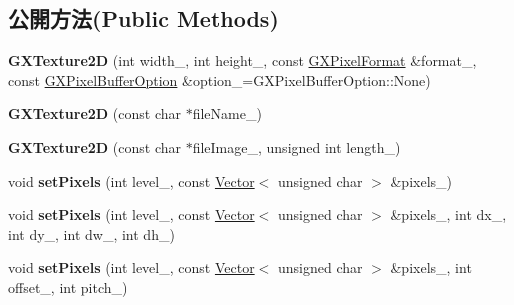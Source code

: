 \subsection*{公開方法(Public Methods)}
\begin{DoxyCompactItemize}
\item 
{\bfseries G\+X\+Texture2D} (int width\+\_\+, int height\+\_\+, const \hyperlink{class_i_dream_sky_1_1_g_x_pixel_format}{G\+X\+Pixel\+Format} \&format\+\_\+, const \hyperlink{class_i_dream_sky_1_1_g_x_pixel_buffer_option}{G\+X\+Pixel\+Buffer\+Option} \&option\+\_\+=G\+X\+Pixel\+Buffer\+Option\+::\+None)\hypertarget{class_i_dream_sky_1_1_g_x_texture2_d_af2883838dfbb887234486878f519c29e}{}\label{class_i_dream_sky_1_1_g_x_texture2_d_af2883838dfbb887234486878f519c29e}

\item 
{\bfseries G\+X\+Texture2D} (const char $\ast$file\+Name\+\_\+)\hypertarget{class_i_dream_sky_1_1_g_x_texture2_d_a9025f664d2fa0cc7e0f4b911809fde10}{}\label{class_i_dream_sky_1_1_g_x_texture2_d_a9025f664d2fa0cc7e0f4b911809fde10}

\item 
{\bfseries G\+X\+Texture2D} (const char $\ast$file\+Image\+\_\+, unsigned int length\+\_\+)\hypertarget{class_i_dream_sky_1_1_g_x_texture2_d_ac49b237e5e8dc37812b043bada830181}{}\label{class_i_dream_sky_1_1_g_x_texture2_d_ac49b237e5e8dc37812b043bada830181}

\item 
void {\bfseries set\+Pixels} (int level\+\_\+, const \hyperlink{class_i_dream_sky_1_1_vector}{Vector}$<$ unsigned char $>$ \&pixels\+\_\+)\hypertarget{class_i_dream_sky_1_1_g_x_texture2_d_a99b1fd15acda4d83f0834939e2f5a1ed}{}\label{class_i_dream_sky_1_1_g_x_texture2_d_a99b1fd15acda4d83f0834939e2f5a1ed}

\item 
void {\bfseries set\+Pixels} (int level\+\_\+, const \hyperlink{class_i_dream_sky_1_1_vector}{Vector}$<$ unsigned char $>$ \&pixels\+\_\+, int dx\+\_\+, int dy\+\_\+, int dw\+\_\+, int dh\+\_\+)\hypertarget{class_i_dream_sky_1_1_g_x_texture2_d_a61f6f8b275a8ef7cdbec91286ee4bcc9}{}\label{class_i_dream_sky_1_1_g_x_texture2_d_a61f6f8b275a8ef7cdbec91286ee4bcc9}

\item 
void {\bfseries set\+Pixels} (int level\+\_\+, const \hyperlink{class_i_dream_sky_1_1_vector}{Vector}$<$ unsigned char $>$ \&pixels\+\_\+, int offset\+\_\+, int pitch\+\_\+)\hypertarget{class_i_dream_sky_1_1_g_x_texture2_d_a7cbed9618f7b462c4af2860b262509f0}{}\label{class_i_dream_sky_1_1_g_x_texture2_d_a7cbed9618f7b462c4af2860b262509f0}


\end{DoxyCompactItemize}
